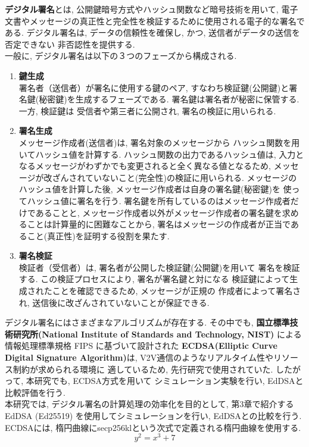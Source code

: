 \textbf{デジタル署名}とは, 公開鍵暗号方式やハッシュ関数など暗号技術を用いて, 
電子文書やメッセージの真正性と完全性を検証するために使用される電子的な署名である. 
デジタル署名は, データの信頼性を確保し, かつ, 送信者がデータの送信を否定できない
非否認性を提供する.\\
\indent 一般に, デジタル署名は以下の３つのフェーズから構成される.

\begin{enumerate}
  \item \textbf{鍵生成}\\
  \indent 署名者（送信者）が署名に使用する鍵のペア, 
  すなわち検証鍵(公開鍵)と署名鍵(秘密鍵)を生成するフェーズである. 
  署名鍵は署名者が秘密に保管する. 一方, 検証鍵は
  受信者や第三者に公開され, 署名の検証に用いられる.
  \item \textbf{署名生成}\\
  \indent メッセージ作成者(送信者)は, 署名対象のメッセージから
  ハッシュ関数を用いてハッシュ値を計算する. ハッシュ関数の出力であるハッシュ値は, 
  入力となるメッセージがわずかでも変更されると全く異なる値となるため, 
  メッセージが改ざんされていないこと(完全性)の検証に用いられる. 
  メッセージのハッシュ値を計算した後, メッセージ作成者は自身の署名鍵(秘密鍵)を
  使ってハッシュ値に署名を行う. 署名鍵を所有しているのはメッセージ作成者だけであることと, 
  メッセージ作成者以外がメッセージ作成者の署名鍵を求めることは計算量的に困難なことから, 
  署名はメッセージの作成者が正当であること(真正性)を証明する役割を果たす. 
  \item \textbf{署名検証}\\
  \indent 検証者（受信者）は, 署名者が公開した検証鍵(公開鍵)を用いて
  署名を検証する. この検証プロセスにより, 署名が署名鍵と対になる
  検証鍵によって生成されたことを確認できるため, メッセージが正規の
  作成者によって署名され, 送信後に改ざんされていないことが保証できる.
\end{enumerate}

デジタル署名にはさまざまなアルゴリズムが存在する. その中でも,    
\textbf{国立標準技術研究所(National Institute of Standards and Technology, NIST)}
による情報処理標準規格 FIPS に基づいて設計された
\textbf{ECDSA(Elliptic Curve Digital Signature Algorithm)}は, 
V2V通信のようなリアルタイム性やリソース制約が求められる環境に
適しているため, 先行研究\cite{shinato}で使用されていた. 
したがって, 本研究でも, ECDSA方式を用いて
シミュレーション実験を行い, EdDSAと比較評価を行う. \\
% 

\indent 本研究では, デジタル署名の計算処理の効率化を目的として, 
第3章で紹介するEdDSA (Ed25519) を使用してシミュレーションを行い, 
EdDSAとの比較を行う. \\
\indent ECDSAには, 楕円曲線にsecp256klという次式で定義される楕円曲線を使用する.  
\[
  y^2 = x^3 + 7 
\]
